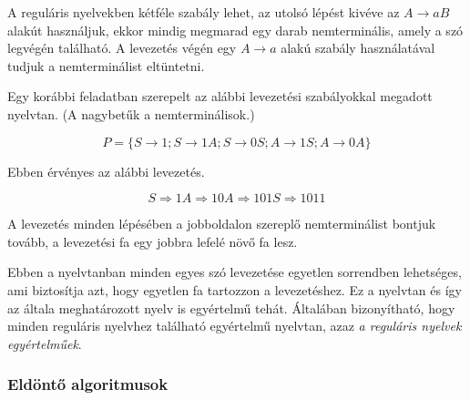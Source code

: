 \documentclass[a4paper]{article}
\begin{document}
A reguláris nyelvekben kétféle szabály lehet, az utolsó lépést kivéve az
$A \to aB$ alakút használjuk, ekkor mindig megmarad egy darab
nemterminális, amely a szó legvégén található. A levezetés végén egy $A
\to a$ alakú szabály használatával tudjuk a nemterminálist eltüntetni.

Egy korábbi feladatban szerepelt az alábbi levezetési szabályokkal
megadott nyelvtan. (A nagybetűk a nemterminálisok.)

\[P=\{S\rightarrow 1; S\rightarrow 1A; S\rightarrow 0S; A\rightarrow 1S; A\rightarrow 0A\}\]

Ebben érvényes az alábbi levezetés.

\[
 S \Rightarrow 1A \Rightarrow 10A \Rightarrow 101S \Rightarrow 1011
\]

A levezetés minden lépésében a jobboldalon szereplő nemterminálist
bontjuk tovább, a levezetési fa egy jobbra lefelé növő fa lesz.


Ebben a nyelvtanban minden egyes szó levezetése egyetlen sorrendben
lehetséges, ami biztosítja azt, hogy egyetlen fa tartozzon a
levezetéshez. Ez a nyelvtan és így az általa meghatározott nyelv is
egyértelmű tehát. Általában bizonyítható, hogy minden reguláris nyelvhez
található egyértelmű nyelvtan, azaz \emph{a reguláris nyelvek
egyértelműek}.

\subsubsection{Eldöntő algoritmusok}
\end{document}
